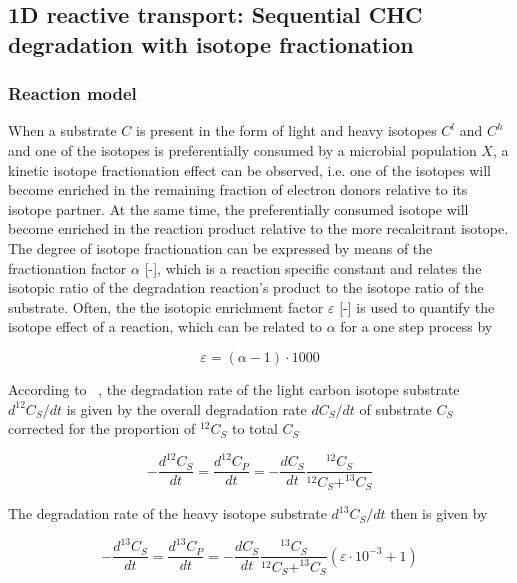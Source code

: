 \subsection[Sequential CHC degradation with isotope fractionation (1D)]{1D reactive transport: Sequential CHC degradation with isotope fractionation}
\label{l_s_benchmark_isofrac}

\subsubsection*{Reaction model}

When a substrate $C$ is present in the form of light and heavy isotopes $C^l$ and $C^h$ and one of the isotopes is preferentially consumed by a microbial population $X$, a kinetic isotope fractionation effect can be observed, i.e. one of the isotopes will become enriched in the remaining fraction of electron donors relative to its isotope partner. At the same time, the preferentially consumed isotope will become enriched in the reaction product relative to the more recalcitrant isotope. The degree of isotope fractionation can be expressed by means of the fractionation factor $\alpha$ [-], which is a reaction specific constant and relates the isotopic ratio of the degradation reaction's product to the isotope ratio of the substrate. Often, the the isotopic enrichment factor $\varepsilon $ [-] is used to quantify the isotope effect of a reaction, which can be related to $\alpha$ for a one step process by

\begin{equation}
    \varepsilon =  (\alpha -1)\cdot1000
    \label{iso_enrichfac}
\end{equation}

According to ~\cite{VanBr:05}, the degradation rate of the light carbon isotope substrate $d^{12}C_S/dt$ is given by the overall degradation rate $dC_S/dt$ of substrate $C_S$ corrected for the proportion of $^{12}C_S$ to total $C_S$

\begin{equation}
    -\frac{d^{12}C_S}{dt} = \frac{d^{12}C_P}{dt} = -\frac{dC_S}{dt} \frac{^{12}C_S}{^{12}C_S + ^{13}C_S}
    \label{iso_rate_gen1}
\end{equation}

The degradation rate of the heavy isotope substrate $d^{13}C_S/dt$ then is given by

\begin{equation}
    -\frac{d^{13}C_S}{dt} = \frac{d^{13}C_P}{dt} = -\frac{dC_S}{dt} \frac{^{13}C_S}{^{12}C_S + ^{13}C_S}(\varepsilon\cdot10^{-3}+1)
    \label{iso_rate_gen2}
\end{equation}

